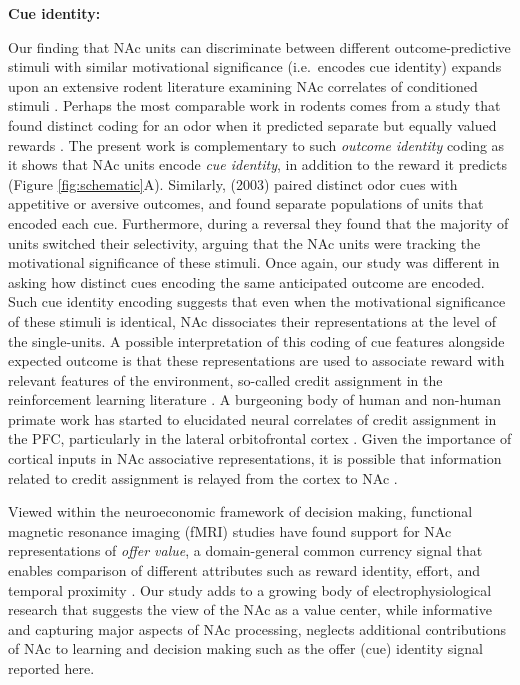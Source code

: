 \documentclass[11pt]{article}
\let\cite=\citep
\begin{document}
{\bf Cue identity:}

Our finding that NAc units can discriminate between different
outcome-predictive stimuli with similar motivational significance
(i.e.\ encodes cue identity) expands upon an extensive rodent
literature examining NAc correlates of conditioned stimuli
\cite{Setlow2003,Nicola2004,Yun2004,Roitman2005,Day2006,Ambroggi2008,Ishikawa2008,Roesch2009a,Saddoris2011,Goldstein2012,Lansink2012,Bissonette2013,McGinty2013,Atallah2014,Sugam2014,Cooch2015,West2016,Dejean2017}. Perhaps
the most comparable work in rodents comes from a study that found
distinct coding for an odor when it predicted separate but equally
valued rewards \cite{Cooch2015}. The present work is complementary to
such {\it outcome identity} coding as it shows that NAc units encode
{\it cue identity}, in addition to the reward it predicts (Figure
\ref{fig:schematic}A). Similarly, \citeauthor{Setlow2003} (2003)
paired distinct odor cues with appetitive or aversive outcomes, and
found separate populations of units that encoded each
cue. Furthermore, during a reversal they found that the majority of
units switched their selectivity, arguing that the NAc units were
tracking the motivational significance of these stimuli. Once again,
our study was different in asking how distinct cues encoding the same
anticipated outcome are encoded. Such cue identity encoding suggests
that even when the motivational significance of these stimuli is
identical, NAc dissociates their representations at the level of the
single-units. A possible interpretation of this coding of cue
features alongside expected outcome is that these representations are
used to associate reward with relevant features of the environment,
so-called credit assignment in the reinforcement learning literature
\cite{sutton1998}. A burgeoning body of human and non-human primate
work has started to elucidated neural correlates of credit assignment
in the PFC, particularly in the lateral orbitofrontal cortex
\cite{Chau2015,Akaishi2016,Asaad2017,Noonan2017}. Given the importance
of cortical inputs in NAc associative representations, it is possible
that information related to credit assignment is relayed from the
cortex to NAc \cite{Ishikawa2008,Cooch2015}.

Viewed within the neuroeconomic framework of decision making,
functional magnetic resonance imaging (fMRI) studies have found
support for NAc representations of {\it offer value}, a domain-general
common currency signal that enables comparison of different attributes
such as reward identity, effort, and temporal proximity
\cite{Peters2009,Levy2012,Bartra2013,Sescousse2015}. Our study adds to
a growing body of electrophysiological research that suggests the view
of the NAc as a value center, while informative and capturing major
aspects of NAc processing, neglects additional contributions of NAc to
learning and decision making such as the offer (cue) identity signal
reported here.
\end{document}
